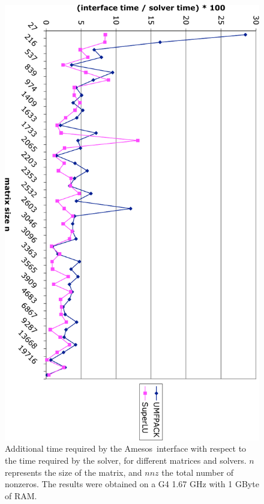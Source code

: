 \documentclass[acmtocl]{acmtrans2m}
\newcommand{\amesos}{{\sc Amesos}}
\begin{document}
\begin{figure}
\begin{center}
\includegraphics[angle=90,width=13cm]{interface_time.pdf}
\caption{Additional time required by the \amesos\ interface with respect to the
time required by the solver, for different matrices and solvers. $n$
  represents the size of the matrix, and $nnz$ the total number of nonzeros.
The results were obtained on a G4 1.67 GHz with 1 GByte of RAM.}
\label{fig:results}
\end{center}
\end{figure}

\end{document}
